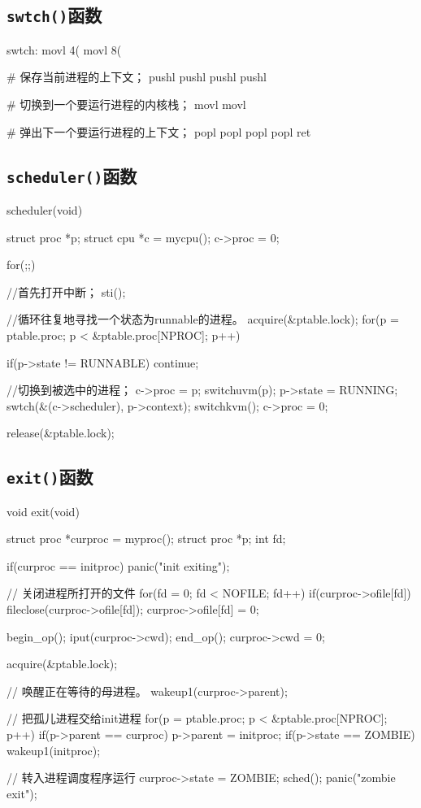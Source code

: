 \documentclass{swfcthesismscctex}
\begin{document}
\subsection{\texttt{swtch()}函数}
\label{sec:swtch}

\begin{gascode}
swtch:
  movl 4(%
  movl 8(%
 
  # 保存当前进程的上下文；
  pushl %
  pushl %
  pushl %
  pushl %
 
  # 切换到一个要运行进程的内核栈；
  movl %
  movl %
 
  # 弹出下一个要运行进程的上下文；
  popl %
  popl %
  popl %
  popl %
  ret
\end{gascode}

\subsection{\texttt{scheduler()}函数}
\label{sec:scheduler}

\begin{ccode}
scheduler(void)
{
  struct proc *p;
  struct cpu *c = mycpu();
  c->proc = 0;
  
  for(;;){
    //首先打开中断；
    sti();

    //循环往复地寻找一个状态为runnable的进程。
    acquire(&ptable.lock);
    for(p = ptable.proc; p < &ptable.proc[NPROC]; p++){
      if(p->state != RUNNABLE)
        continue;

      //切换到被选中的进程；
      c->proc = p;
      switchuvm(p);
      p->state = RUNNING;
      swtch(&(c->scheduler), p->context);
      switchkvm();
      c->proc = 0;
    }
    release(&ptable.lock);
  }
}
\end{ccode}


\subsection{\texttt{exit()}函数}
\label{sec:exit}

\begin{ccode}
void exit(void)
{
  struct proc *curproc = myproc();
  struct proc *p;
  int fd;

  if(curproc == initproc)
    panic("init exiting");

  // 关闭进程所打开的文件
  for(fd = 0; fd < NOFILE; fd++){
    if(curproc->ofile[fd]){
      fileclose(curproc->ofile[fd]);
      curproc->ofile[fd] = 0;
    }
  }

  begin_op();
  iput(curproc->cwd);
  end_op();
  curproc->cwd = 0;

  acquire(&ptable.lock);

  // 唤醒正在等待的母进程。
  wakeup1(curproc->parent);

  // 把孤儿进程交给init进程
  for(p = ptable.proc; p < &ptable.proc[NPROC]; p++){
    if(p->parent == curproc){
      p->parent = initproc;
      if(p->state == ZOMBIE)
        wakeup1(initproc);
    }
  }

  // 转入进程调度程序运行
  curproc->state = ZOMBIE;
  sched();
  panic("zombie exit");
}
\end{ccode}
\end{document}
